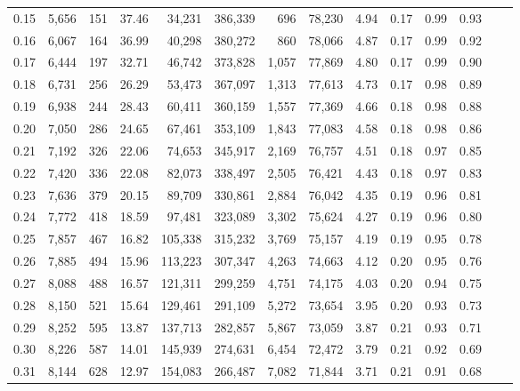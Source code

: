 \begin{tabular}{rrrrrrrrrrrrrr}
0.15 &  5,656 &    151 &   37.46 &   34,231 &  386,339 &     696 &  78,230 &  4.94 &  0.17 &  0.99 &      0.93 \\
0.16 &  6,067 &    164 &   36.99 &   40,298 &  380,272 &     860 &  78,066 &  4.87 &  0.17 &  0.99 &      0.92 \\
0.17 &  6,444 &    197 &   32.71 &   46,742 &  373,828 &   1,057 &  77,869 &  4.80 &  0.17 &  0.99 &      0.90 \\
0.18 &  6,731 &    256 &   26.29 &   53,473 &  367,097 &   1,313 &  77,613 &  4.73 &  0.17 &  0.98 &      0.89 \\
0.19 &  6,938 &    244 &   28.43 &   60,411 &  360,159 &   1,557 &  77,369 &  4.66 &  0.18 &  0.98 &      0.88 \\
0.20 &  7,050 &    286 &   24.65 &   67,461 &  353,109 &   1,843 &  77,083 &  4.58 &  0.18 &  0.98 &      0.86 \\
0.21 &  7,192 &    326 &   22.06 &   74,653 &  345,917 &   2,169 &  76,757 &  4.51 &  0.18 &  0.97 &      0.85 \\
0.22 &  7,420 &    336 &   22.08 &   82,073 &  338,497 &   2,505 &  76,421 &  4.43 &  0.18 &  0.97 &      0.83 \\
0.23 &  7,636 &    379 &   20.15 &   89,709 &  330,861 &   2,884 &  76,042 &  4.35 &  0.19 &  0.96 &      0.81 \\
0.24 &  7,772 &    418 &   18.59 &   97,481 &  323,089 &   3,302 &  75,624 &  4.27 &  0.19 &  0.96 &      0.80 \\
0.25 &  7,857 &    467 &   16.82 &  105,338 &  315,232 &   3,769 &  75,157 &  4.19 &  0.19 &  0.95 &      0.78 \\
0.26 &  7,885 &    494 &   15.96 &  113,223 &  307,347 &   4,263 &  74,663 &  4.12 &  0.20 &  0.95 &      0.76 \\
0.27 &  8,088 &    488 &   16.57 &  121,311 &  299,259 &   4,751 &  74,175 &  4.03 &  0.20 &  0.94 &      0.75 \\
0.28 &  8,150 &    521 &   15.64 &  129,461 &  291,109 &   5,272 &  73,654 &  3.95 &  0.20 &  0.93 &      0.73 \\
0.29 &  8,252 &    595 &   13.87 &  137,713 &  282,857 &   5,867 &  73,059 &  3.87 &  0.21 &  0.93 &      0.71 \\
0.30 &  8,226 &    587 &   14.01 &  145,939 &  274,631 &   6,454 &  72,472 &  3.79 &  0.21 &  0.92 &      0.69 \\
0.31 &  8,144 &    628 &   12.97 &  154,083 &  266,487 &   7,082 &  71,844 &  3.71 &  0.21 &  0.91 &      0.68 \\

\end{tabular}
